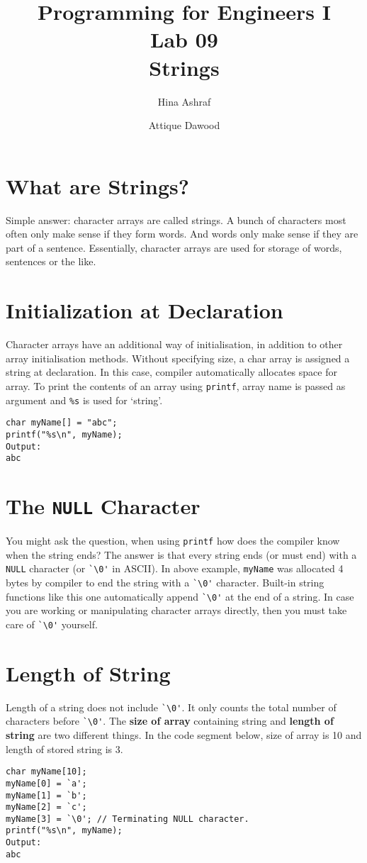 \documentclass{article}
\title{Programming for Engineers I\\Lab 09\\Strings}
\author{Hina Ashraf\and Attique Dawood}
\begin{document}
\maketitle
\section{What are Strings?}
Simple answer: character arrays are called strings. A bunch of characters most often only make sense if they form words. And words only make sense if they are part of a sentence. Essentially, character arrays are used for storage of words, sentences or the like.
\section{Initialization at Declaration}
Character arrays have an additional way of initialisation, in addition to other array initialisation methods. Without specifying size, a char array is assigned a string at declaration. In this case, compiler automatically allocates space for array. To print the contents of an array using \texttt{printf}, array name is passed as argument and \texttt{\%s} is used for `string'.
\begin{verbatim}
char myName[] = "abc";
printf("%s\n", myName);
Output:
abc
\end{verbatim}
\section{The \texttt{NULL} Character}
You might ask the question, when using \texttt{printf} how does the compiler know when the string ends? The answer is that every string ends (or must end) with a \texttt{NULL} character (or \verb|`\0'| in ASCII). In above example, \texttt{myName} was allocated 4 bytes by compiler to end the string with a \verb|`\0'| character. Built-in string functions like this one automatically append \verb|`\0'| at the end of a string. In case you are working or manipulating character arrays directly, then you must take care of \verb|`\0'| yourself.
\section{Length of String}
Length of a string does not include \verb|`\0'|. It only counts the total number of characters before \verb|`\0'|. The \textbf{size of array} containing string and \textbf{length of string} are two different things. In the code segment below, size of array is 10 and length of stored string is 3.
\begin{verbatim}
char myName[10];
myName[0] = `a';
myName[1] = `b';
myName[2] = `c';
myName[3] = `\0'; // Terminating NULL character.
printf("%s\n", myName);
Output:
abc
\end{verbatim}
\end{document}
